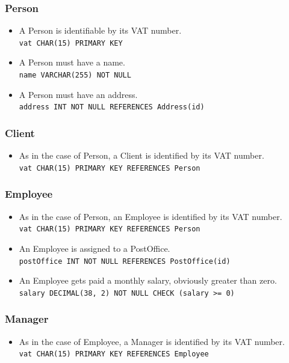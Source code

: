 \documentclass{report}[a4paper]
\theoremstyle{remark}
\begin{document}
\subsubsection{Person}
\begin{itemize}
    \item A Person is identifiable by its VAT number.                                           \\ \texttt{vat CHAR(15) PRIMARY KEY}
    \item A Person must have a name.                                                            \\ \texttt{name VARCHAR(255) NOT NULL}
    \item A Person must have an address.                                                        \\ \texttt{address INT NOT NULL REFERENCES Address(id)}
\end{itemize}
\subsubsection{Client}
\begin{itemize}
    \item As in the case of Person, a Client is identified by its VAT number.                   \\ \texttt{vat CHAR(15) PRIMARY KEY REFERENCES Person}
\end{itemize}
\subsubsection{Employee}
\begin{itemize}
    \item As in the case of Person, an Employee is identified by its VAT number.                \\ \texttt{vat CHAR(15) PRIMARY KEY REFERENCES Person}
    \item An Employee is assigned to a PostOffice.                                              \\ \texttt{postOffice INT NOT NULL REFERENCES PostOffice(id)}
    \item An Employee gets paid a monthly salary, obviously greater than zero.                  \\ \texttt{salary DECIMAL(38, 2) NOT NULL CHECK (salary >= 0)}
\end{itemize}
\subsubsection{Manager}
\begin{itemize}
    \item As in the case of Employee, a Manager is identified by its VAT number.                \\ \texttt{vat CHAR(15) PRIMARY KEY REFERENCES Employee}
\end{itemize}
\end{document}
